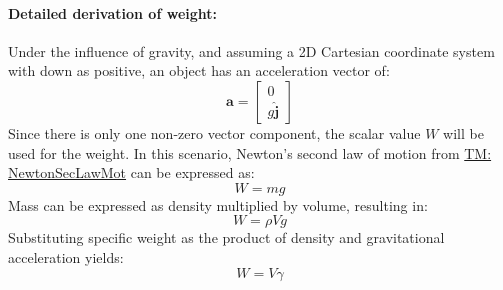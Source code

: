 \documentclass[12pt]{article}
\begin{document}
\paragraph{Detailed derivation of weight:}
\label{GD:weightDeriv}
Under the influence of gravity, and assuming a 2D Cartesian coordinate system with down as positive, an object has an acceleration vector of:
\begin{displaymath}
\mathbf{a}=\begin{bmatrix}
           0\\
g \mathbf{\hat{j}}
           \end{bmatrix}
\end{displaymath}
Since there is only one non-zero vector component, the scalar value $W$ will be used for the weight. In this scenario, Newton's second law of motion from \hyperref[TM:NewtonSecLawMot]{TM: NewtonSecLawMot} can be expressed as:
\begin{displaymath}
W=m g
\end{displaymath}
Mass can be expressed as density multiplied by volume, resulting in:
\begin{displaymath}
W=ρ V g
\end{displaymath}
Substituting specific weight as the product of density and gravitational acceleration yields:
\begin{displaymath}
W=V γ
\end{displaymath}
\par~
\end{document}

